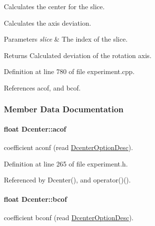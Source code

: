 Calculates the center for the slice. 

Calculates the axis deviation.


\begin{DoxyParams}{Parameters}
{\em slice} & The index of the slice.\\
\hline
\end{DoxyParams}
\begin{DoxyReturn}{Returns}
Calculated deviation of the rotation axis. 
\end{DoxyReturn}


Definition at line 780 of file experiment.cpp.



References acof, and bcof.



\subsubsection{Member Data Documentation}
\hypertarget{classDcenter_a9de6d5a7c455510669dd32d9bf2cae29}{
\paragraph[{acof}]{\setlength{\rightskip}{0pt plus 5cm}float {\bf Dcenter::acof}}\hfill}
\label{classDcenter_a9de6d5a7c455510669dd32d9bf2cae29}


coefficient aconf (read \hyperlink{group__experiment_gae4e896096ce7a0b4cbfbdd88b7e56286}{DcenterOptionDesc}). 



Definition at line 265 of file experiment.h.



Referenced by Dcenter(), and operator()().

\hypertarget{classDcenter_ae0f1e1a8c261f7e1d8c364b24f174601}{
\paragraph[{bcof}]{\setlength{\rightskip}{0pt plus 5cm}float {\bf Dcenter::bcof}}\hfill}
\label{classDcenter_ae0f1e1a8c261f7e1d8c364b24f174601}


coefficient bconf (read \hyperlink{group__experiment_gae4e896096ce7a0b4cbfbdd88b7e56286}{DcenterOptionDesc}). 



